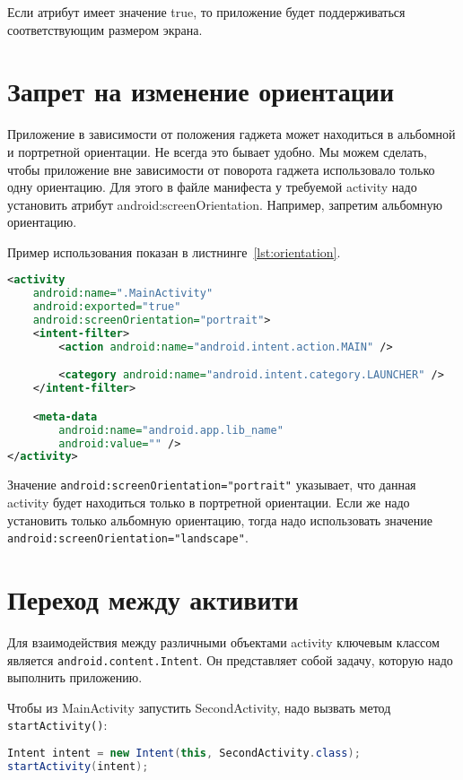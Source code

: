 Если атрибут имеет значение true, то приложение будет поддерживаться
соответствующим размером экрана.

\section{Запрет на изменение ориентации}
Приложение в зависимости от положения гаджета может находиться в
альбомной и портретной ориентации. Не всегда это бывает удобно. Мы
можем сделать, чтобы приложение вне зависимости от поворота гаджета
использовало только одну ориентацию. Для этого в файле манифеста у
требуемой activity надо установить атрибут android:screenOrientation.
Например, запретим альбомную ориентацию.\par
Пример использования показан в листнинге~\ref{lst:orientation}.

\begin{lstlisting}[language=XML
	, caption=\leftline{}
	, label=lst:orientation
	]
<activity
	android:name=".MainActivity"
	android:exported="true"
	android:screenOrientation="portrait">
	<intent-filter>
		<action android:name="android.intent.action.MAIN" />

		<category android:name="android.intent.category.LAUNCHER" />
	</intent-filter>

	<meta-data
		android:name="android.app.lib_name"
		android:value="" />
</activity>
\end{lstlisting}

Значение \texttt{android:screenOrientation="portrait"} указывает,
что данная activity будет находиться только в портретной ориентации.
Если же надо установить только альбомную ориентацию, тогда надо использовать
значение \texttt{android:screenOrientation="landscape"}.

\section{Переход между активити}
Для взаимодействия между различными объектами activity ключевым
классом является \texttt{android.content.Intent}. Он представляет собой
задачу, которую надо выполнить приложению.\par
Чтобы из MainActivity запустить SecondActivity, надо вызвать метод
\texttt{startActivity()}:

\begin{lstlisting}[language=Java
	, caption=\leftline{Создание намеренья}
	]
Intent intent = new Intent(this, SecondActivity.class);
startActivity(intent);
\end{lstlisting}

